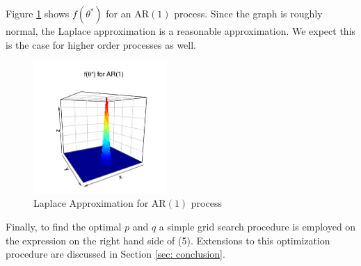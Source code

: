  
 

 Figure \ref{fig:laplace} shows $f(\theta^*)$ for an AR$(1)$ process. Since the graph is roughly normal, the Laplace approximation is a reasonable approximation.  We expect this is the case for higher order processes as well.

\begin{figure}
    \centering
    \includegraphics[width=2in]{ar1Laplace_v2.png}
    \caption{Laplace Approximation for AR$(1)$ process}
    \label{fig:laplace}
\end{figure}

Finally, to find the optimal $p$ and $q$ a simple grid search procedure is employed on the expression on the right hand side of (5).  Extensions to this optimization procedure are discussed in Section \ref{sec: conclusion}.

